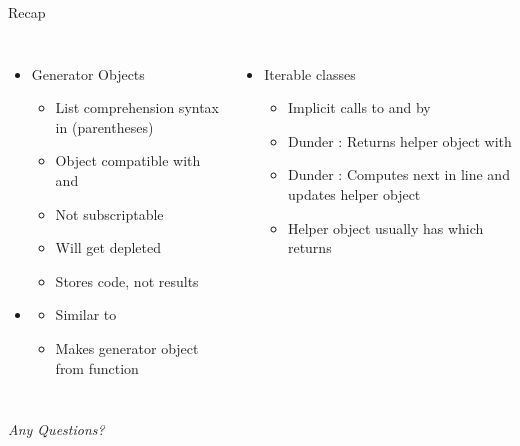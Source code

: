 
\begin{frame}[t,plain]
\titlepage
\end{frame}


\begin{frame}{Recap}
%
\begin{columns}[T]
\begin{itemize}
\item Generator Objects
	\begin{itemize}
	\item List comprehension syntax in (parentheses)
	\item Object compatible with  and 
	\item Not subscriptable
	\item Will get depleted
	\item Stores code, not results
	\end{itemize}
\item {}
	\begin{itemize}
	\item Similar to 
	\item Makes generator object from function
	\end{itemize}
\end{itemize}
%
\begin{itemize}
\item Iterable classes
	\begin{itemize}
	\item Implicit calls to  and  by 
	\item Dunder : Returns helper object with 
	\item Dunder : Computes next in line and updates helper object
	\item Helper object usually has  which returns 
	\end{itemize}
\end{itemize}

\end{columns}
%
\begin{center}
	\emph{Any Questions?}
\end{center}
%
\end{frame}

